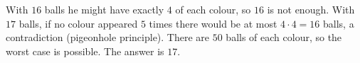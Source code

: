 With $16$ balls he might have exactly $4$ of each colour, so $16$ is not enough. With $17$ balls, if no colour appeared $5$ times there would be at most $4\cdot4=16$ balls, a contradiction (pigeonhole principle). There are $50$ balls of each colour, so the worst case is possible. The answer is $\boxed{17}$.
